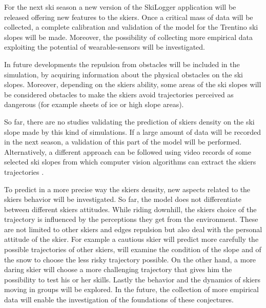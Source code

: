 \documentclass[12pt,a4paper,twoside]{book}
\begin{document}
For the next ski season a new version of the SkiLogger application will be released offering new features to the skiers. Once a critical mass of data will be collected, a complete calibration and validation of the model for the Trentino ski slopes will be made. Moreover, the possibility of collecting more empirical data exploiting the potential of wearable-sensors will be investigated.

In future developments the repulsion from obstacles will be included in the simulation, by acquiring information about the physical obstacles on the ski slopes. Moreover, depending on the skiers ability, some areas of the ski slopes will be considered obstacles to make the skiers avoid trajectories perceived as dangerous (for example sheets of ice or high slope areas).

So far, there are no studies validating the prediction of skiers density on the ski slope made by this kind of simulations. If a large amount of data will be recorded in the next season, a validation of this part of the model will be performed. Alternatively, a different approach can be followed using video records of some selected ski slopes from which computer vision algorithms can extract the skiers trajectories \cite{sc2010}.

To predict in a more precise way the skiers density, new aspects related to the skiers behavior will be investigated. So far, the model does not differentiate between different skiers attitudes. While riding downhill, the skiers choice of the trajectory is influenced by the perceptions they get from the environment. These are not limited to other skiers and edges repulsion but also deal with the personal attitude of the skier. For example a cautious skier will predict more carefully the possible trajectories of other skiers, will examine the condition of the slope and of the snow to choose the less risky trajectory possible. On the other hand, a more daring skier will choose a more challenging trajectory that gives him the possibility to test his or her skills. Lastly the behavior and the dynamics of skiers moving in groups will be explored. In the future, the collection of more empirical data will enable the investigation of the foundations of these conjectures.



\appendix
\end{document}
